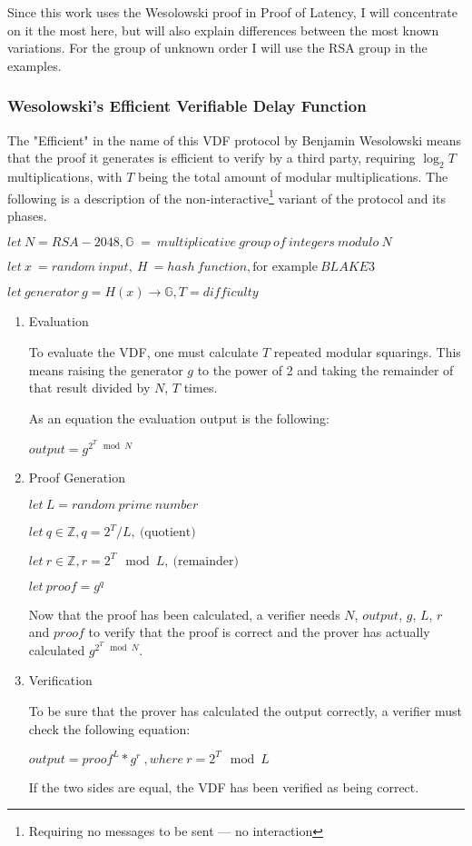 Since this work uses the Wesolowski proof in Proof of Latency, I will concentrate on it the most here, but will also explain differences between the most known variations. For the group of unknown order I will use the RSA group in the examples.

\subsubsection{Wesolowski's Efficient Verifiable Delay Function}
The "Efficient" in the name of this VDF protocol by Benjamin Wesolowski means that the proof it generates is efficient to verify by a third party, requiring \( \log _{2} T \) multiplications, with \( T \) being the total amount of modular multiplications. The following is a description of the non-interactive\footnote{Requiring no messages to be sent --- no interaction} variant of the protocol and its phases.

\( let \: N = RSA-2048, \mathbb{G} \; = \: multiplicative \: group \: of \: integers \: modulo \: N \)

\( let \: x \: = random \: input,  \: H \: = hash \: function, \text{for example} \: BLAKE3 \)

\( let \: generator \: g = H(x) \to \mathbb{G}, T = difficulty \)

\begin{enumerate}
	\item{Evaluation}

          To evaluate the VDF, one must calculate \(T\) repeated modular squarings. This means raising the generator $g$ to the power of 2 and taking the remainder of that result divided by $N$, $T$ times.

	      As an equation the evaluation output is the following:

	      \( output = g^{2^{T} \mod N } \)

	\item{Proof Generation}

	      \( let \: L = random \: prime \: number \)

	      \( let \: q \in \mathbb{Z}, q = 2^T/L, \: \text{(quotient)} \)

	      \( let \: r \in \mathbb{Z}, r = 2^T\mod L, \: \text{(remainder)} \)

	      \( let \: proof = g^q \)

	      Now that the proof has been calculated, a verifier needs $N$, $output$, $g$, $L$, $r$ and $proof$ to verify that the proof is correct and the prover has actually calculated $g^{2^{T} \mod N }$.

	\item{Verification}

	      To be sure that the prover has calculated the output correctly, a verifier must check the following equation:

	      \( output = proof^L * g^r \:, where \: r = 2^T \mod L \)

	      If the two sides are equal, the VDF has been verified as being correct.
\end{enumerate}

